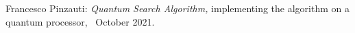 \thispagestyle{empty}

\hfill

\vfill

\noindent Francesco Pinzauti: \textit{Quantum Search Algorithm,} implementing the algorithm on a quantum processor, \textcopyright\ October 2021.
